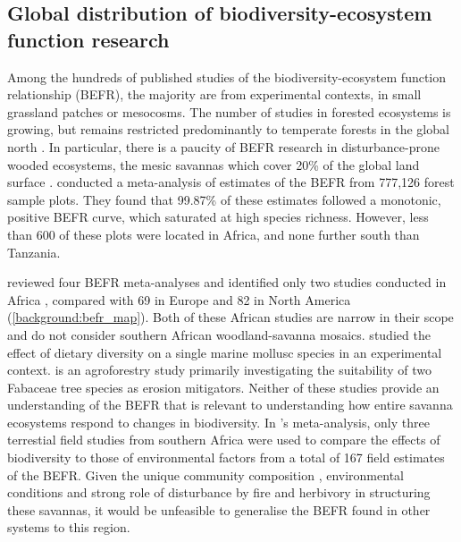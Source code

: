 \begin{refsection}
\subsection{Global distribution of biodiversity-ecosystem function research}
\label{background:ssec:befr_global}

Among the hundreds of published studies of the biodiversity-ecosystem function relationship (BEFR), the majority are from experimental contexts, in small grassland patches or mesocosms. The number of studies in forested ecosystems is growing, but remains restricted predominantly to temperate forests in the global north \citep{Clarke2017}. In particular, there is a paucity of BEFR research in disturbance-prone wooded ecosystems, the mesic savannas which cover \textapprox{}20\% of the global land surface \citep{Scholes1993}. \citet{Liang2016} conducted a meta-analysis of estimates of the BEFR from 777,126 forest sample plots. They found that 99.87\% of these estimates followed a monotonic, positive BEFR curve, which saturated at high species richness. However, less than 600 of these plots were located in Africa, and none further south than Tanzania. 

\citet{Clarke2017} reviewed four BEFR meta-analyses \citep{Gamfeldt2015, Griffin2013a, Zhang2012, Cardinale2009} and identified only two studies conducted in Africa \citep{Foster1999, Burleigh1997}, compared with 69 in Europe and 82 in North America (\autoref{background:befr_map}). Both of these African studies are narrow in their scope and do not consider southern African woodland-savanna mosaics. \citet{Foster1999} studied the effect of dietary diversity on a single marine mollusc species in an experimental context. \citet{Burleigh1997} is an agroforestry study primarily investigating the suitability of two Fabaceae tree species as erosion mitigators. Neither of these studies provide an understanding of the BEFR that is relevant to understanding how entire savanna ecosystems respond to changes in biodiversity. In \citeauthor{Duffy2017}'s \citeyearpar{Duffy2017} meta-analysis, only three terrestial field studies from southern Africa were used to compare the effects of biodiversity to those of environmental factors from a total of 167 field estimates of the BEFR. Given the unique community composition \citep{Lehmann2011}, environmental conditions \citep{Linder2003} and strong role of disturbance by fire and herbivory in structuring these savannas, it would be unfeasible to generalise the BEFR found in other systems to this region.


\end{refsection}
